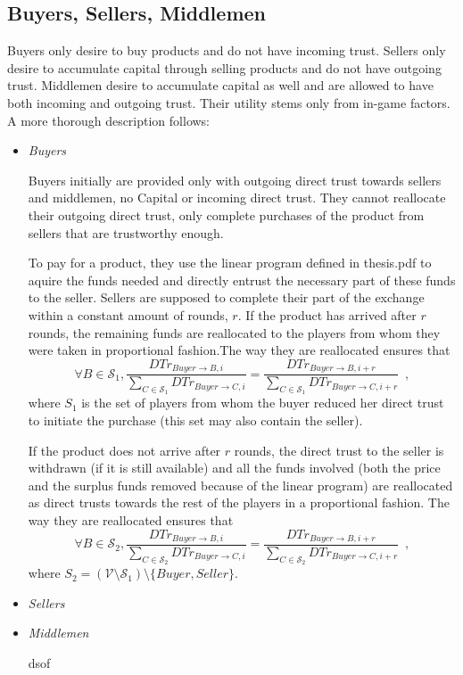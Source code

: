 \subsection{Buyers, Sellers, Middlemen}
  Buyers only desire to buy products and do not have incoming trust. Sellers only desire to accumulate capital through selling
  products and do not have outgoing trust. Middlemen desire to accumulate capital as well and are allowed to have both
  incoming and outgoing trust. Their utility stems only from in-game factors. A more thorough description follows:

  \begin{itemize}
    \item \textit{Buyers}

    Buyers initially are provided only with outgoing direct trust towards sellers and middlemen, no Capital or incoming direct
    trust. They cannot reallocate their outgoing direct trust, only complete purchases of the product from sellers that are
    trustworthy enough.
    
    To pay for a product, they use the linear program defined in thesis.pdf to aquire the funds needed and directly entrust
    the necessary part of these funds to the seller. Sellers are supposed to complete their part of the exchange within a
    constant amount of rounds, $r$. If the product has arrived after $r$ rounds, the remaining funds are reallocated to the
    players from whom they were taken in proportional fashion.The way they are reallocated ensures that
    \begin{equation*}
      \forall B \in \mathcal{S}_1, \frac{DTr_{Buyer \rightarrow B, i}}{\sum\limits_{C \in \mathcal{S}_1}DTr_{Buyer \rightarrow
      C, i}} = \frac{DTr_{Buyer \rightarrow B, i + r}}{\sum\limits_{C \in \mathcal{S}_1}DTr_{Buyer \rightarrow C, i + r}}
      \enspace,
    \end{equation*}
    where $S_1$ is the set of players from whom the buyer reduced her direct trust to initiate the purchase (this set may also
    contain the seller).

    If the product does not arrive after $r$ rounds, the direct trust to the seller is withdrawn (if it is still available)
    and all the funds involved (both the price and the surplus funds removed because of the linear program) are reallocated as
    direct trusts towards the rest of the players in a proportional fashion. The way they are reallocated ensures that
    \begin{equation*}
      \forall B \in \mathcal{S}_2, \frac{DTr_{Buyer \rightarrow B, i}}{\sum\limits_{C \in \mathcal{S}_2}DTr_{Buyer \rightarrow
      C, i}} = \frac{DTr_{Buyer \rightarrow B, i + r}}{\sum\limits_{C \in \mathcal{S}_2}DTr_{Buyer \rightarrow C, i + r}}
      \enspace,
    \end{equation*}
    where $S_2 = \left(\mathcal{V} \setminus \mathcal{S}_1\right) \setminus{\{Buyer, Seller\}}$.
    \item \textit{Sellers}

    \item \textit{Middlemen}

    dsof
  \end{itemize}
